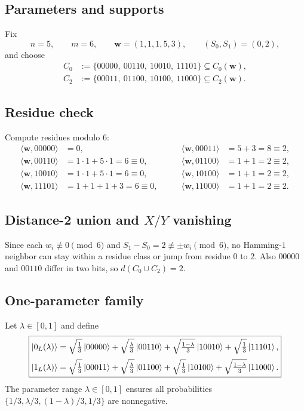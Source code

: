 \documentclass[11pt]{article}
\begin{document}
\subsection{Parameters and supports}
Fix
\[
n=5,\qquad m=6,\qquad \mathbf w=(1,1,1,5,3),\qquad (S_0,S_1)=(0,2),
\]
and choose
\[
\begin{aligned}
C_0 &:=\{00000,\ 00110,\ 10010,\ 11101\}\subseteq C_0(\mathbf w),\\
C_2 &:=\{00011,\ 01100,\ 10100,\ 11000\}\subseteq C_2(\mathbf w).
\end{aligned}
\]

\subsection{Residue check}
Compute residues modulo $6$:
\[
\begin{aligned}
\langle \mathbf w,00000\rangle&=0,\\
\langle \mathbf w,00110\rangle&=1\cdot 1+5\cdot 1=6\equiv 0,\\
\langle \mathbf w,10010\rangle&=1\cdot 1+5\cdot 1=6\equiv 0,\\
\langle \mathbf w,11101\rangle&=1+1+1+3=6\equiv 0,
\end{aligned}
\qquad
\begin{aligned}
\langle \mathbf w,00011\rangle&=5+3=8\equiv 2,\\
\langle \mathbf w,01100\rangle&=1+1=2\equiv 2,\\
\langle \mathbf w,10100\rangle&=1+1=2\equiv 2,\\
\langle \mathbf w,11000\rangle&=1+1=2\equiv 2.
\end{aligned}
\]

\subsection{Distance-2 union and $X/Y$ vanishing}
Since each $w_i\not\equiv 0\pmod 6$ and $S_1-S_0=2\not\equiv \pm w_i\pmod 6$,
no Hamming-$1$ neighbor can stay within a residue class or jump from residue $0$ to $2$.
Also $00000$ and $00110$ differ in two bits, so $d(C_0\cup C_2)=2$.

\subsection{One-parameter family}
Let $\lambda\in[0,1]$ and define
\[
\boxed{
\begin{aligned}
\ket{0_L(\lambda)}
&=
\sqrt{\tfrac13}\ket{00000}
+\sqrt{\tfrac{\lambda}{3}}\ket{00110}
+\sqrt{\tfrac{1-\lambda}{3}}\ket{10010}
+\sqrt{\tfrac13}\ket{11101},\\[2pt]
\ket{1_L(\lambda)}
&=
\sqrt{\tfrac13}\ket{00011}
+\sqrt{\tfrac{\lambda}{3}}\ket{01100}
+\sqrt{\tfrac13}\ket{10100}
+\sqrt{\tfrac{1-\lambda}{3}}\ket{11000}.
\end{aligned}}
\]
The parameter range $\lambda\in[0,1]$ ensures all probabilities
$\{1/3,\lambda/3,(1-\lambda)/3,1/3\}$ are nonnegative.
\end{document}
